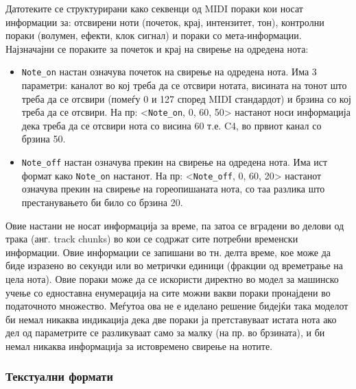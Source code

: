 Датотеките се структурирани како секвенци од MIDI пораки кои носат информации за: отсвирени ноти (почеток, крај, интензитет, тон), контролни пораки (волумен, ефекти, клок сигнал) и пораки со мета-информации. Најзначајни се пораките за почеток и крај на свирење на одредена нота:
\begin{itemize}
    \item \texttt{Note\_on} настан означува почеток на свирење на одредена нота. Има 3 параметри: каналот во кој треба да се отсвири нотата, висината на тонот што треба да се отсвири (помеѓу 0 и 127 според MIDI стандардот) и брзина со кој треба да се отсвири. На пр: <\texttt{Note\_on}, 0, 60, 50> настанот носи информација дека треба да се отсвири нота со висина 60 т.е. C4, во првиот канал со брзина 50.
    \item \texttt{Note\_off} настан означува прекин на свирење на одредена нота. Има ист формат како \texttt{Note\_on} настанот. На пр: <\texttt{Note\_off}, 0, 60, 20> настанот означува прекин на свирење на гореопишаната нота, со таа разлика што престанувањето би било со брзина 20.
\end{itemize}
Овие настани не носат информација за време, па затоа се вградени во делови од трака (анг. track chunks) во кои се содржат сите потребни временски информации. Овие информации се запишани во тн. делта време, кое може да биде изразено во секунди или во метрички единици (фракции од времетрање на цела нота).
Овие пораки може да се искористи директно во модел за машинско учење со едноставна енумерација на сите можни вакви пораки пронајдени во податочното множество. Меѓутоа ова не е иделано решение бидејќи така моделот би немал никаква индикација дека две пораки ја претставуваат истата нота ако дел од параметрите се разликуваат само за малку (на пр. во брзината), и би немал никаква информација за истовремено свирење на нотите.

\subsubsection{Текстуални формати}

